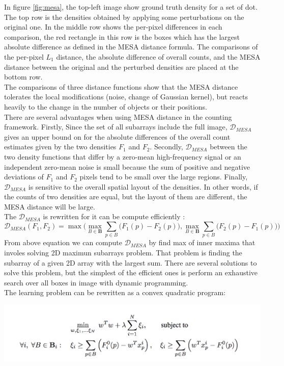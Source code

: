 In figure \ref{fig:mesa}, the top-left image show ground truth density for a set of dot. The top row is the densities obtained by applying some perturbations on the original one. In the middle row shows the per-pixel differences in each comparison, the red rectangle in this row is the boxes which has the largest absolute difference as defined in the MESA distance formula. The comparisons of the per-pixel $L_1$ distance, the absolute difference of overall counts, and the MESA distance between the original and the perturbed densities are placed at the bottom row.\\
The comparisons of three distance functions show that the MESA distance tolerates the local modifications (noise, change of Gaussian kernel), but reacts heavily to the change in the number of objects or their positions.\\
There are several advantages when using MESA distance in the counting framework. Firstly, Since the set of all subarrays include the full image, $\mathcal{D}_{MESA}$ gives an upper bound on for the absolute differences of the overall count estimates given by the two densities $F_1$ and $F_2$. Secondly, $\mathcal{D}_{MESA}$ between the two density functions that differ by a zero-mean high-frequency signal or an independent zero-mean noise is small because the sum of positive and negative deviations of $F_1$ and $F_2$ pixels tend to be small over the large regions. Finally, $\mathcal{D}_{MESA}$ is sensitive to the overall spatial layout of the densities. In other words, if the counts of two densities are equal, but the layout of them are different, the MESA distance will be large.\\
The $\mathcal{D}_{MESA}$ is rewritten for it can be compute efficiently :
\begin{displaymath}
    \mathcal{D}_{MESA}(F_{1},F_{2}) = \max\bigg( \max_{B \in \textbf{B}}   \sum_{p \in B}{\big(F_{1}(p) - F_{2}(p)\big)},  \max_{B \in \textbf{B}} \sum_{p \in B}{\big(F_{2}(p) - F_{1}(p)\big)} \bigg)
\end{displaymath}
From above equation we can compute $\mathcal{D}_{MESA}$ by find max of inner maxima that involes solving 2D maximun subarrays problem. That problem is finding the subarray of a given 2D array with the largest sum. There are several solutions to solve this problem, but the simplest of the efficient ones is perform an exhaustive search over all boxes in image with dynamic programming. \\

The learning problem can be rewritten as a convex quadratic program:
\begin{center}
    \includegraphics[width=\textwidth]{Chapters/Fig/learningeq}
\end{center}

